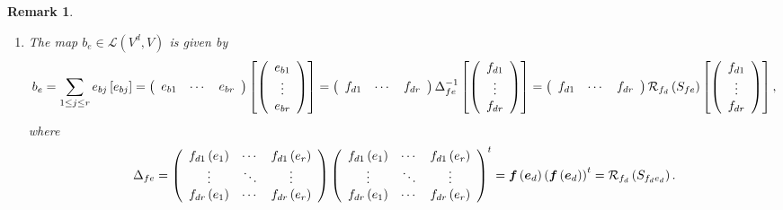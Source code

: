 \documentclass[aps,preprint]{revtex4}
\newtheorem{remark}[theorem]{Remark}
\begin{document}
\begin{remark}
\begin{enumerate}
\item The map $b_{e}\in \mathcal{L}\left( V^{d},V\right) $ is given by 
\begin{equation}
b_{e}=\sum_{1\leq j\leq r}e_{bj}\left[ e_{bj}\right] =\left( 
\begin{array}{ccc}
e_{b1} & \cdots & e_{br}%
\end{array}%
\right) \left[ \left( 
\begin{array}{c}
e_{b1} \\ 
\vdots \\ 
e_{br}%
\end{array}%
\right) \right] =\left( 
\begin{array}{ccc}
f_{d1} & \cdots & f_{dr}%
\end{array}%
\right) {\LARGE \Delta }_{fe}^{-1}\left[ \left( 
\begin{array}{c}
f_{d1} \\ 
\vdots \\ 
f_{dr}%
\end{array}%
\right) \right] =\left( 
\begin{array}{ccc}
f_{d1} & \cdots & f_{dr}%
\end{array}%
\right) \mathcal{R}_{f_{d}}\left( S_{fe}\right) \left[ \left( 
\begin{array}{c}
f_{d1} \\ 
\vdots \\ 
f_{dr}%
\end{array}%
\right) \right] ,
\end{equation}%
where 
\begin{equation}
{\LARGE \Delta }_{fe}=\left( 
\begin{array}{ccc}
f_{d1}\left( e_{1}\right) & \cdots & f_{d1}\left( e_{r}\right) \\ 
\vdots & \ddots & \vdots \\ 
f_{dr}\left( e_{1}\right) & \cdots & f_{dr}\left( e_{r}\right)%
\end{array}%
\right) \left( 
\begin{array}{ccc}
f_{d1}\left( e_{1}\right) & \cdots & f_{d1}\left( e_{r}\right) \\ 
\vdots & \ddots & \vdots \\ 
f_{dr}\left( e_{1}\right) & \cdots & f_{dr}\left( e_{r}\right)%
\end{array}%
\right) ^{t}=\boldsymbol{f}\left( \boldsymbol{e}_{d}\right) \left( 
\boldsymbol{f}\left( \boldsymbol{e}_{d}\right) \right) ^{t}=\mathcal{R}%
_{f_{d}}\left( S_{f_{d}e_{d}}\right) .
\end{equation}


\end{enumerate}
\end{remark}
\end{document}
